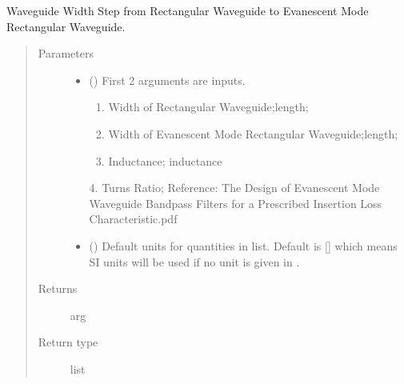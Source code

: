 \documentclass[letterpaper,10pt,english]{sphinxmanual}
\begin{document}

\begin{fulllineitems}
\label{\detokenize{components:components.RectWG2EvanescentRectWGStep}}
Waveguide Width Step from Rectangular Waveguide to Evanescent Mode Rectangular Waveguide.
\begin{quote}\begin{description}
\item[{Parameters}] \leavevmode\begin{itemize}
\item {} 
 () \textendash{} 
First 2 arguments are inputs.
\begin{enumerate}
%
\item {} 
Width of Rectangular Waveguide;length;

\item {} 
Width of Evanescent Mode Rectangular Waveguide;length;

\item {} 
Inductance; inductance

\end{enumerate}

4. Turns Ratio;
Reference:  The Design of Evanescent Mode Waveguide Bandpass Filters for a Prescribed Insertion Loss Characteristic.pdf


\item {} 
 (\sphinxstyleliteralemphasis{\sphinxupquote{, }}) \textendash{} Default units for quantities in  list. Default is {[}{]} which means SI units will be used if no unit is given in .

\end{itemize}

\item[{Returns}] \leavevmode
arg

\item[{Return type}] \leavevmode
list

\end{description}\end{quote}

\end{fulllineitems}
\end{document}
